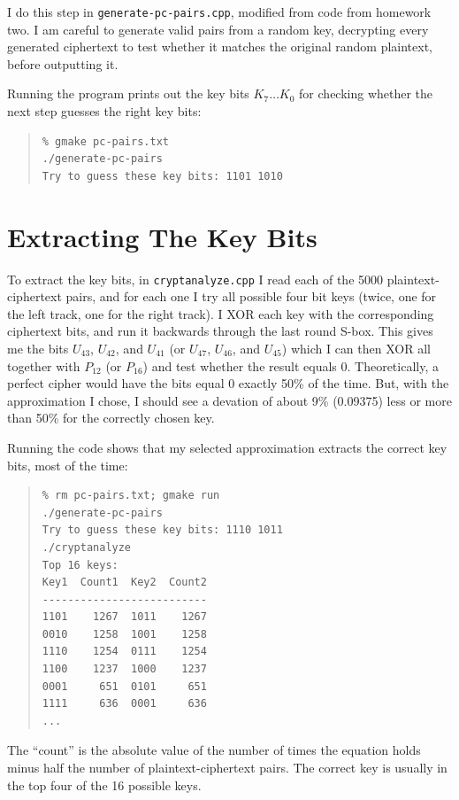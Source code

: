 \documentclass{amsart}
\begin{document}
I do this step in \texttt{generate-pc-pairs.cpp}, modified from code from homework two.  I am careful to generate valid pairs from a random key, decrypting every generated ciphertext to test whether it matches the original random plaintext, before outputting it.

Running the program prints out the key bits $K_7\ldots K_0$ for checking whether the next step guesses the right key bits:

\begin{quote}
\begin{verbatim}
% gmake pc-pairs.txt
./generate-pc-pairs
Try to guess these key bits: 1101 1010
\end{verbatim}
\end{quote}

\section{Extracting The Key Bits}
To extract the key bits, in \texttt{cryptanalyze.cpp} I read each of the 5000 plaintext-ciphertext pairs, and for each one I try all possible four bit keys (twice, one for the left track, one for the right track).  I XOR each key with the corresponding ciphertext bits, and run it backwards through the last round S-box.  This gives me the bits $U_{43}$, $U_{42}$, and $U_{41}$ (or $U_{47}$, $U_{46}$, and $U_{45}$) which I can then XOR all together with $P_{12}$ (or $P_{16}$) and test whether the result equals 0.  Theoretically, a perfect cipher would have the bits equal 0 exactly 50\% of the time.  But, with the approximation I chose, I should see a devation of about 9\% (0.09375) less or more than 50\% for the correctly chosen key.

Running the code shows that my selected approximation extracts the correct key bits, most of the time:

\begin{quote}
\begin{verbatim}
% rm pc-pairs.txt; gmake run
./generate-pc-pairs
Try to guess these key bits: 1110 1011 
./cryptanalyze
Top 16 keys:
Key1  Count1  Key2  Count2
--------------------------
1101    1267  1011    1267
0010    1258  1001    1258
1110    1254  0111    1254
1100    1237  1000    1237
0001     651  0101     651
1111     636  0001     636
...
\end{verbatim}
\end{quote}

The ``count'' is the absolute value of the number of times the equation holds minus half the number of plaintext-ciphertext pairs.  The correct key is usually in the top four of the 16 possible keys.
\end{document}
